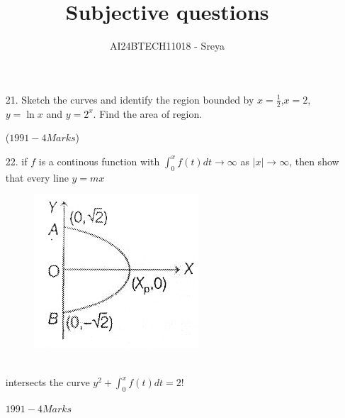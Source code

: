 \documentclass[journal,12pt,twocolumn]{IEEEtran}
\theoremstyle{remark}
\begin{document}

\vspace{3cm}

\title{Subjective questions}
\author{AI24BTECH11018 - Sreya}
\maketitle
\newpage
\bigskip
\begin{enumerate}

    

\renewcommand{\thefigure}{\theenumi}
\renewcommand{\thetable}{\theenumi}
\item[21.] Sketch the curves and identify the region bounded by $x=\frac{1}{2}$,$x=2$,$y=\ln{x}$ and $y=2^x$. Find the area of region.

\hfill{($1991-4 Marks$)}

\item[22.] if $f$ is a continous function with $\int_{0}^{x}f(t)dt\rightarrow\infty$ as $\mid x \mid\rightarrow\infty$, then show that every line $y=mx$\\
\begin{figure}[h!]
    \centering
    \includegraphics[width=\linewidth]{image.jpg}
    \label{figure1}
\end{figure}\\
intersects the curve $y^2+\int_{0}^{x}f(t)dt=2!$

\hfill{$1991-4 Marks$}\\


\end{enumerate}
\end{document}
